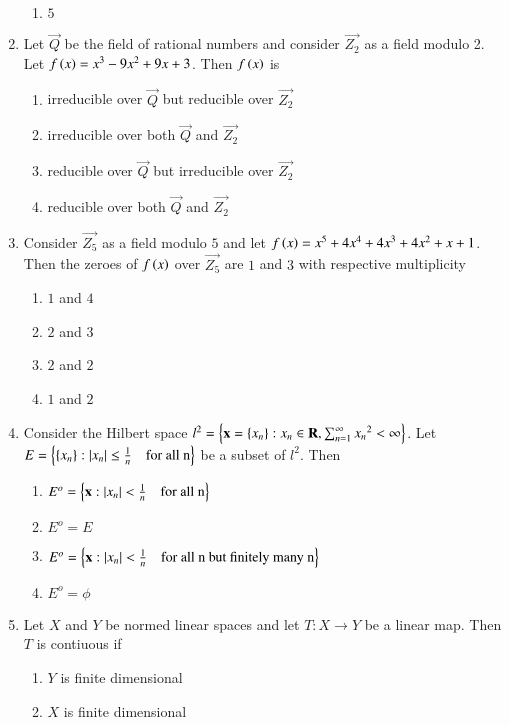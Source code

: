 \documentclass[journal,12pt,onecolumn]{IEEEtran}
\theoremstyle{remark}
\begin{document}
\begin{enumerate}
\begin{enumerate}
        \item $5$
    \end{enumerate}
    \item Let $\vec{Q}$ be the field of rational numbers and consider $\vec{Z_2}$ as a field modulo 2. Let $f\left(x\right)=x^3-9x^2+9x+3$. Then $f\left(x\right)$ is
    \begin{enumerate}
        \item irreducible over $\vec{Q}$ but reducible over $\vec{Z_2}$
        \item irreducible over both $\vec{Q}$ and $\vec{Z_2}$
        \item reducible over $\vec{Q}$ but irreducible over $\vec{Z_2}$
        \item reducible over both $\vec{Q}$ and $\vec{Z_2}$
    \end{enumerate}
    \item Consider $\vec{Z_5}$ as a field modulo $5$ and let $f\left(x\right)=x^5+4x^4+4x^3+4x^2+x+1$. Then the zeroes of $f\left(x\right)$ over $\vec{Z_5}$ are $1$ and $3$ with respective multiplicity
    \begin{enumerate}
        \item $1$ and $4$
        \item $2$ and $3$
        \item $2$ and $2$
        \item $1$ and $2$
    \end{enumerate}
    \item Consider the Hilbert space $l^2=\left\{\mathbf{x}=\left\{x_n\right\}:x_n \in \mathbf{R},\sum_{n=1}^{\infty}{x_n}^2<\infty\right\}$. Let $E=\left\{\left\{x_n\right\}:\left\vert x_n\right\vert\leq\frac{1}{n}\quad\text{for all n}\right\}$ be a subset of $l^2$. Then
    \begin{enumerate}
        \item $E^o=\left\{\mathbf{x}:\left\vert x_n\right\vert<\frac{1}{n}\quad \text{for all n}\right\}$
        \item $E^o=E$
        \item $E^o=\left\{\mathbf{x}:\left\vert x_n\right\vert<\frac{1}{n}\quad \text{for all n but finitely many n}\right\}$
        \item $E^o=\phi$
    \end{enumerate}
    \item Let $X$ and $Y$ be normed linear spaces and let $T:X \to Y$ be a linear map. Then $T$ is contiuous if 
    \begin{enumerate}
        \item $Y$ is finite dimensional
        \item $X$ is finite dimensional

\end{enumerate}
\end{enumerate}
\end{document}
